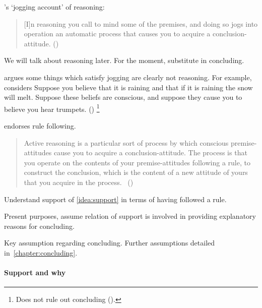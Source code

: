 \begin{note}
  \citeauthor{Broome:2002aa}'s `jogging account' of reasoning:

  \begin{quote}
    [I]n reasoning you call to mind some of the premises, and doing so jogs into operation an automatic process that causes you to acquire a conclusion-attitude.%
    \mbox{}\hfill\mbox{(\citeyear[226]{Broome:2002aa})}
  \end{quote}

  {
    \color{red}
    We will talk about reasoning later.
    For the moment, substitute in concluding.
    }

  \citeauthor{Broome:2002aa} argues some things which satisfy jogging are clearly not reasoning.
  For example, \citeauthor{Broome:2002aa} considers
  {
    \color{red}
    Suppose you believe that it is raining and that if it is raining the snow will melt. Suppose these beliefs are conscious, and suppose they cause you to believe you hear trumpets.
  }
  (\citeyear[225,226--227]{Broome:2002aa})%
  \footnote{
    Does not rule out concluding (\citeyear[231,233]{Broome:2002aa}).
  }

  \citeauthor{Broome:2002aa} endorses rule following.

  \begin{quote}
    Active reasoning is a particular sort of process by which conscious premise-attitudes cause you to acquire a conclusion-attitude.
    The process is that you operate on the contents of your premise-attitudes following a rule, to construct the conclusion, which is the content of a new attitude of yours that you acquire in the process.\newline
    \mbox{ }\hfill\mbox{(\citeyear[234]{Broome:2002aa})}
  \end{quote}

  Understand support of \autoref{idea:support} in terms of having followed a rule.
\end{note}

\begin{note}
  Present purposes, assume relation of support is involved in providing explanatory reasons for concluding.
\end{note}

\begin{note}
  Key assumption regarding concluding.
  Further assumptions detailed in~\autoref{chapter:concluding}.
\end{note}

\paragraph{Support and why}

